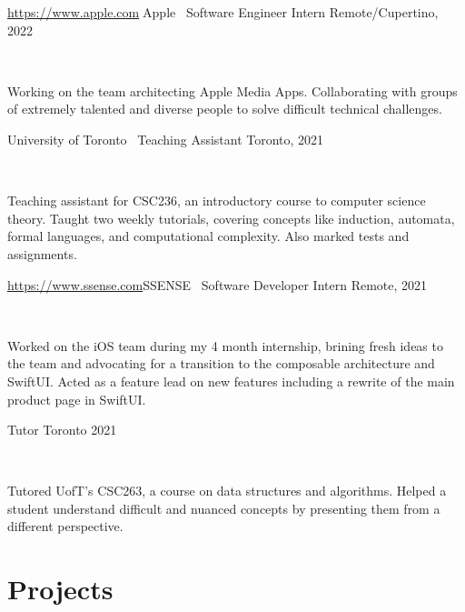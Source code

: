 \documentclass[]{style}
\begin{document}
\begin{entrylist}

\vspace{2mm}

\entry
{\url{https://www.apple.com}{Apple} \ {\normalfont Software Engineer Intern}}
{Remote/Cupertino, 2022}
{ ~ \vspace{-2.5mm}

  

Working on the team architecting Apple Media Apps. Collaborating with groups of extremely talented and diverse people to solve difficult technical challenges. 
}

\vspace{2mm}


\entry
{University of Toronto \ {\normalfont Teaching Assistant}}
{Toronto, 2021}
{ ~ \vspace{-2.5mm}

  

Teaching assistant for CSC236, an introductory course to computer science theory. Taught two weekly tutorials, covering concepts like induction, automata, formal languages, and computational complexity. Also marked tests and assignments. 
}

\vspace{2mm}

\entry
{\url{https://www.ssense.com}{SSENSE} \ {\normalfont Software Developer Intern}}
{Remote, 2021}
{ ~ \vspace{-2.5mm}

 

Worked on the iOS team during my 4 month internship, brining fresh ideas to the team and advocating for a transition to the composable architecture and SwiftUI. Acted as a feature lead on new features including a rewrite of the main product page in SwiftUI.}


\entry
{Tutor}
{Toronto 2021}
{ ~ \vspace{-2.5mm}

 

Tutored UofT's CSC263, a course on data structures and algorithms. Helped a student understand difficult and nuanced concepts by presenting them from a different perspective.}

\end{entrylist}

\section{Projects}
\end{document}
